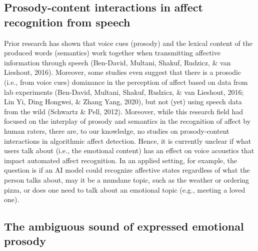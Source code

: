 \documentclass[
  english,
  man,floatsintext]{apa6}
\begin{document}
\hypertarget{prosody-content-interactions-in-affect-recognition-from-speech}{%
\subsection{Prosody-content interactions in affect recognition from speech}\label{prosody-content-interactions-in-affect-recognition-from-speech}}

Prior research has shown that voice cues (prosody) and the lexical content of the produced words (semantics) work together when transmitting affective information through speech (Ben-David, Multani, Shakuf, Rudzicz, \& van Lieshout, 2016). Moreover, some studies even suggest that there is a prosodic (i.e., from voice cues) dominance in the perception of affect based on data from lab experiments (Ben-David, Multani, Shakuf, Rudzicz, \& van Lieshout, 2016; Lin Yi, Ding Hongwei, \& Zhang Yang, 2020), but not (yet) using speech data from the wild (Schwartz \& Pell, 2012). Moreover, while this research field had focused on the interplay of prosody and semantics in the recognition of affect by human raters, there are, to our knowledge, no studies on prosody-content interactions in algorithmic affect detection. Hence, it is currently unclear if what users talk about (i.e., the emotional content) has an effect on voice acoustics that impact automated affect recognition. In an applied setting, for example, the question is if an AI model could recognize affective states regardless of what the person talks about, may it be a mundane topic, such as the weather or ordering pizza, or does one need to talk about an emotional topic (e.g., meeting a loved one).

\hypertarget{the-ambiguous-sound-of-expressed-emotional-prosody}{%
\subsection{The ambiguous sound of expressed emotional prosody}\label{the-ambiguous-sound-of-expressed-emotional-prosody}}
\end{document}
